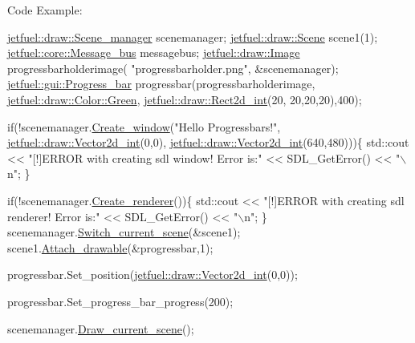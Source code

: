 Code Example\+: 
\begin{DoxyCode}
\hyperlink{classjetfuel_1_1draw_1_1Scene__manager}{jetfuel::draw::Scene\_manager} scenemanager;
\hyperlink{classjetfuel_1_1draw_1_1Scene}{jetfuel::draw::Scene} scene1(1);
\hyperlink{classjetfuel_1_1core_1_1Message__bus}{jetfuel::core::Message\_bus} messagebus;
\hyperlink{classjetfuel_1_1draw_1_1Image}{jetfuel::draw::Image} progressbarholderimage(
                                        \textcolor{stringliteral}{"progressbarholder.png"},
                                          &scenemanager);
\hyperlink{classjetfuel_1_1gui_1_1Progress__bar}{jetfuel::gui::Progress\_bar} progressbar(progressbarholderimage,
                                  \hyperlink{classjetfuel_1_1draw_1_1Color_a529fbdf4a2a9915e3986278715a5daa8}{jetfuel::draw::Color::Green},
                                  \hyperlink{classjetfuel_1_1draw_1_1Rect2d}{jetfuel::draw::Rect2d\_int}(20,
                                                20,20,20),400);

\textcolor{keywordflow}{if}(!scenemanager.\hyperlink{classjetfuel_1_1draw_1_1Scene__manager_a5113e9062c272a22d383ba872417ba31}{Create\_window}(\textcolor{stringliteral}{"Hello Progressbars!"},
                               \hyperlink{classjetfuel_1_1draw_1_1Vector2d}{jetfuel::draw::Vector2d\_int}(0,0),
                          \hyperlink{classjetfuel_1_1draw_1_1Vector2d}{jetfuel::draw::Vector2d\_int}(640,480)))\{
    std::cout << \textcolor{stringliteral}{"[!]ERROR with creating sdl window! Error is:"}
    << SDL\_GetError() << \textcolor{stringliteral}{"\(\backslash\)n"};
\}

\textcolor{keywordflow}{if}(!scenemanager.\hyperlink{classjetfuel_1_1draw_1_1Scene__manager_afafecd926ce5e4b2543a6d583a7d24b6}{Create\_renderer}())\{
    std::cout << \textcolor{stringliteral}{"[!]ERROR with creating sdl renderer! Error is:"}
    << SDL\_GetError() << \textcolor{stringliteral}{"\(\backslash\)n"};
\}
scenemanager.\hyperlink{classjetfuel_1_1draw_1_1Scene__manager_a770c163b88ba8427539ee182315ea989}{Switch\_current\_scene}(&scene1);
scene1.\hyperlink{classjetfuel_1_1draw_1_1Scene_aea4b4c4ae25c30d661be4c52787e0ea3}{Attach\_drawable}(&progressbar,1);

progressbar.Set\_position(\hyperlink{classjetfuel_1_1draw_1_1Vector2d}{jetfuel::draw::Vector2d\_int}(0,0));

progressbar.Set\_progress\_bar\_progress(200);

scenemanager.\hyperlink{classjetfuel_1_1draw_1_1Scene__manager_a8af9a3abfd5121b1b8556342de435773}{Draw\_current\_scene}();
\end{DoxyCode}
 

